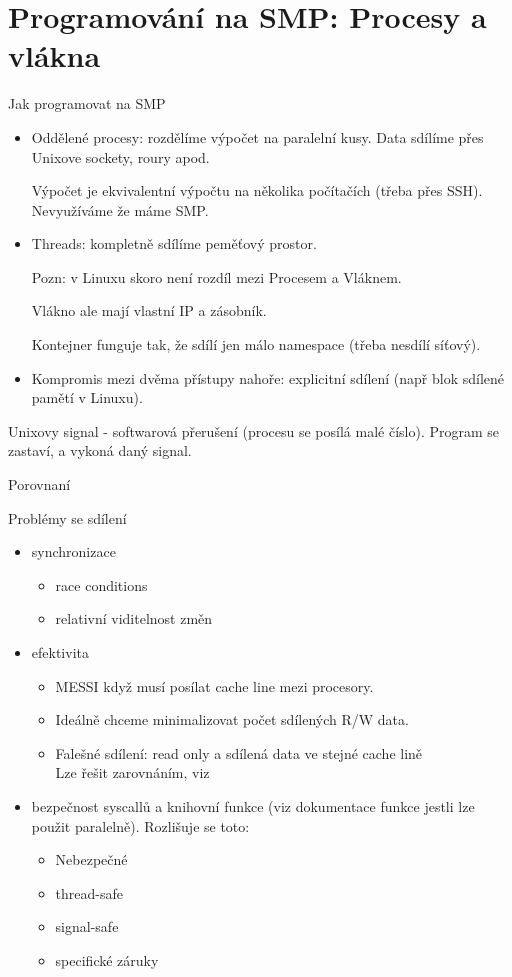 \section{\texorpdfstring{Programování na SMP: Procesy a vlákna}{Programování na SMP: Procesy a vlákna}}
\vspace{5mm}
\large

Jak programovat na SMP
\begin{itemize}
	\item Oddělené procesy: rozdělíme výpočet na paralelní kusy.
		Data sdílíme přes Unixove sockety, roury apod.

		Výpočet je ekvivalentní výpočtu na několika počítačích (třeba přes SSH).
		Nevyužíváme že máme SMP.
	\item Threads: kompletně sdílíme peměťový prostor.

		Pozn: v Linuxu skoro není rozdíl mezi Procesem a Vláknem.

		Vlákno ale mají vlastní IP a zásobník.

		Kontejner funguje tak, že sdílí jen málo namespace (třeba nesdílí síťový).

	\item Kompromis mezi dvěma přístupy nahoře: explicitní sdílení (např blok sdílené pamětí v Linuxu).
\end{itemize}

\begin{definition}
	Unixovy signal - softwarová přerušení (procesu se posílá malé číslo). Program se zastaví, a vykoná daný signal.
\end{definition}

Porovnaní

Problémy se sdílení
\begin{itemize}
	\item synchronizace
		\begin{itemize}
		\item race conditions
		\item relativní viditelnost změn
		\end{itemize}
	\item efektivita
		\begin{itemize}
			\item MESSI když musí posílat cache line mezi procesory.
			\item Ideálně chceme minimalizovat počet sdílených R/W data.
			\item Falešné sdílení: read only a sdílená data ve stejné cache lině \\
				Lze řešit zarovnáním, viz
		\end{itemize}
	\item bezpečnost syscallů a knihovní funkce (viz dokumentace funkce jestli lze použit paralelně).
		Rozlišuje se toto:
		\begin{itemize}
			\item Nebezpečné
			\item thread-safe
			\item signal-safe
			\item specifické záruky
		\end{itemize}
\end{itemize}

